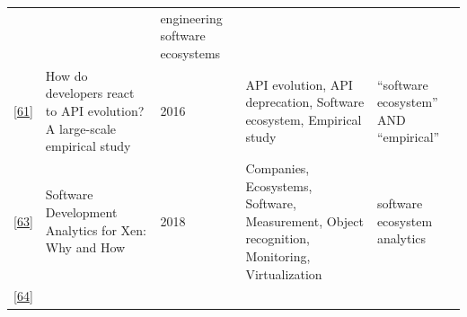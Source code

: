 \documentclass[]{book}
\begin{document}
\begin{longtable}[]{@{}lllll@{}}
\begin{minipage}[t]{0.02\columnwidth}
\end{minipage} & \begin{minipage}[t]{0.34\columnwidth}\raggedright\strut
\strut
\end{minipage} & \begin{minipage}[t]{0.13\columnwidth}\raggedright\strut
engineering software ecosystems\strut
\end{minipage}\tabularnewline
\begin{minipage}[t]{0.05\columnwidth}\raggedright\strut
{[}\protect\hyperlink{ref-Hora2016}{61}{]}\strut
\end{minipage} & \begin{minipage}[t]{0.31\columnwidth}\raggedright\strut
How do developers react to API evolution? A large-scale empirical
study\strut
\end{minipage} & \begin{minipage}[t]{0.02\columnwidth}\raggedright\strut
2016\strut
\end{minipage} & \begin{minipage}[t]{0.34\columnwidth}\raggedright\strut
API evolution, API deprecation, Software ecosystem, Empirical
study\strut
\end{minipage} & \begin{minipage}[t]{0.13\columnwidth}\raggedright\strut
``software ecosystem'' AND ``empirical''\strut
\end{minipage}\tabularnewline
\begin{minipage}[t]{0.05\columnwidth}\raggedright\strut
{[}\protect\hyperlink{ref-Izquierdo2018}{63}{]}\strut
\end{minipage} & \begin{minipage}[t]{0.31\columnwidth}\raggedright\strut
Software Development Analytics for Xen: Why and How\strut
\end{minipage} & \begin{minipage}[t]{0.02\columnwidth}\raggedright\strut
2018\strut
\end{minipage} & \begin{minipage}[t]{0.34\columnwidth}\raggedright\strut
Companies, Ecosystems, Software, Measurement, Object recognition,
Monitoring, Virtualization\strut
\end{minipage} & \begin{minipage}[t]{0.13\columnwidth}\raggedright\strut
software ecosystem analytics\strut
\end{minipage}\tabularnewline
\begin{minipage}[t]{0.05\columnwidth}\raggedright\strut
{[}\protect\hyperlink{ref-Jansen2014}{64}{]}\strut

\end{minipage}
\end{longtable}
\end{document}
